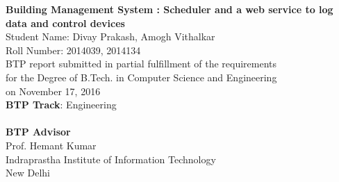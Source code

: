 \def\degree{B.Tech. in Computer Science and Engineering}
\def\btptrack{Engineering}
\def\submissiondate{November 17, 2016}
\def\supervisorone{Prof. Hemant Kumar}
\def\studentone{Divay Prakash, Amogh Vithalkar}
\def\rollnumberone{2014039, 2014134}
\def\titlelineone{Building Management System}
\def\titlelinetwo{Scheduler and a web service to log data and control devices}

\thispagestyle{empty}
\vspace{5.65in}

\begin{center}
\vspace{5.65in}
{\LARGE \bf \titlelineone{} : \titlelinetwo{}\\}
\vspace{.3in}
{\Large{Student Name: \studentone{}}}\\  
{\large{Roll Number: \rollnumberone{}}}\\
\vspace{.1in} 
\vspace{.65in}
\vspace{.65in}
{BTP report submitted in partial fulfillment of the requirements 
\\for the Degree of \degree{}\\}
on \submissiondate{}\\
\vspace{.65in}
\textbf{BTP Track}: \btptrack\\
\quad\\
{\textbf{BTP Advisor}\\ 
\supervisorone\\} 
\vspace{3.0in}
{Indraprastha Institute of Information Technology\\
New Delhi}
\end{center}
